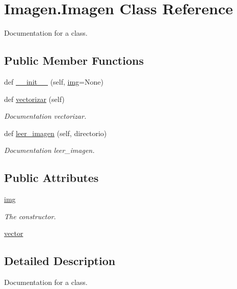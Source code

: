 \hypertarget{class_imagen_1_1_imagen}{}\section{Imagen.\+Imagen Class Reference}
\label{class_imagen_1_1_imagen}


Documentation for a class.  


\subsection*{Public Member Functions}
\begin{DoxyCompactItemize}
\item 
def \mbox{\hyperlink{class_imagen_1_1_imagen_af56feb3348d81937a479c64de374d422}{\+\_\+\+\_\+init\+\_\+\+\_\+}} (self, \mbox{\hyperlink{class_imagen_1_1_imagen_ae3a41e1a6fae0affa3b4735c50212093}{img}}=None)
\item 
def \mbox{\hyperlink{class_imagen_1_1_imagen_a4cdb42ba6cf651b032e66111f2a28219}{vectorizar}} (self)
\begin{DoxyCompactList}\small\item\em Documentation vectorizar. \end{DoxyCompactList}\item 
def \mbox{\hyperlink{class_imagen_1_1_imagen_a76c63b1c129f5ef3e7ea63802209e645}{leer\+\_\+imagen}} (self, directorio)
\begin{DoxyCompactList}\small\item\em Documentation leer\+\_\+imagen. \end{DoxyCompactList}\end{DoxyCompactItemize}
\subsection*{Public Attributes}
\begin{DoxyCompactItemize}
\item 
\mbox{\hyperlink{class_imagen_1_1_imagen_ae3a41e1a6fae0affa3b4735c50212093}{img}}
\begin{DoxyCompactList}\small\item\em The constructor. \end{DoxyCompactList}\item 
\mbox{\hyperlink{class_imagen_1_1_imagen_ad7ff22a9f89ed827ec52d0ccd8934141}{vector}}
\end{DoxyCompactItemize}


\subsection{Detailed Description}
Documentation for a class. 

